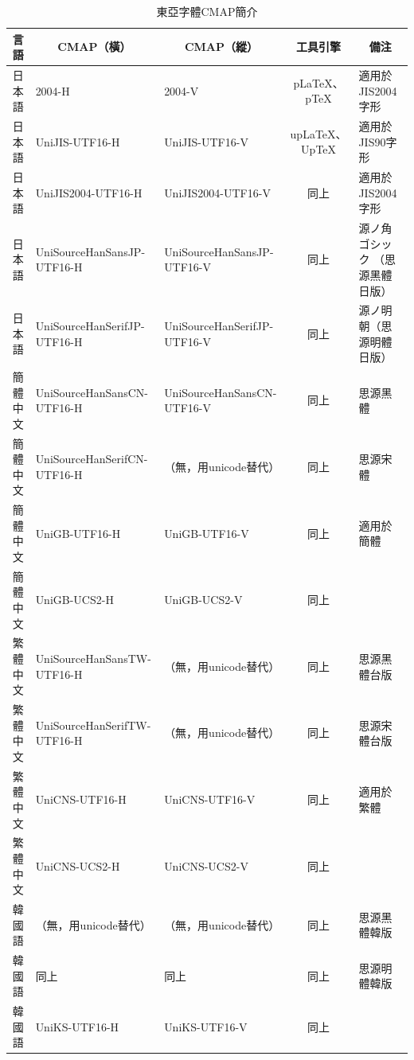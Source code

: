 \begin{table}[H]
\caption{東亞字體CMAP簡介}
{\fontsize{8pt}{12}\selectfont\ttfamily
\begin{tabular}{|c|l|l|c|l|}
\hline
 \multicolumn{1}{|c|}{言 語} & \multicolumn{1}{|c|}{CMAP（橫）}%
  &\multicolumn{1}{|c|}{CMAP（縱）}& \multicolumn{1}{|c|}{工具引擎} & \multicolumn{1}{|c|}{備注} \\ \hline
日本語& 2004-H & 2004-V & {p\LaTeX}、{p\TeX} & 適用於JIS2004字形 \\
日本語& UniJIS-UTF16-H & UniJIS-UTF16-V & {up\LaTeX}、{Up\TeX} & 適用於JIS90字形 \\
日本語& UniJIS2004-UTF16-H & UniJIS2004-UTF16-V & 同上 & 適用於JIS2004字形 \\
日本語& UniSourceHanSansJP-UTF16-H & UniSourceHanSansJP-UTF16-V & 同上 & 源ノ角ゴシック （思源黑體日版） \\
日本語& UniSourceHanSerifJP-UTF16-H & UniSourceHanSerifJP-UTF16-V & 同上 & 源ノ明朝（思源明體日版） \\ \hline
簡體中文& UniSourceHanSansCN-UTF16-H & UniSourceHanSansCN-UTF16-V & 同上 & 思源黑體 \\
簡體中文& UniSourceHanSerifCN-UTF16-H & （無，用unicode替代） & 同上 & 思源宋體 \\
簡體中文& UniGB-UTF16-H & UniGB-UTF16-V & 同上 & 適用於簡體 \\
簡體中文& UniGB-UCS2-H & UniGB-UCS2-V & 同上 &  \\ \hline
繁體中文& UniSourceHanSansTW-UTF16-H & （無，用unicode替代） & 同上 & 思源黑體台版 \\
繁體中文& UniSourceHanSerifTW-UTF16-H & （無，用unicode替代） & 同上 & 思源宋體台版 \\
繁體中文& UniCNS-UTF16-H & UniCNS-UTF16-V & 同上 & 適用於繁體 \\
繁體中文& UniCNS-UCS2-H & UniCNS-UCS2-V & 同上 &  \\ \hline
韓國語& （無，用unicode替代） & （無，用unicode替代） & 同上 & 思源黑體韓版 \\
韓國語& 同上 & 同上 & 同上 & 思源明體韓版 \\
韓國語& UniKS-UTF16-H & UniKS-UTF16-V & 同上 &  \\ \hline
\end{tabular} }
\end{table}

